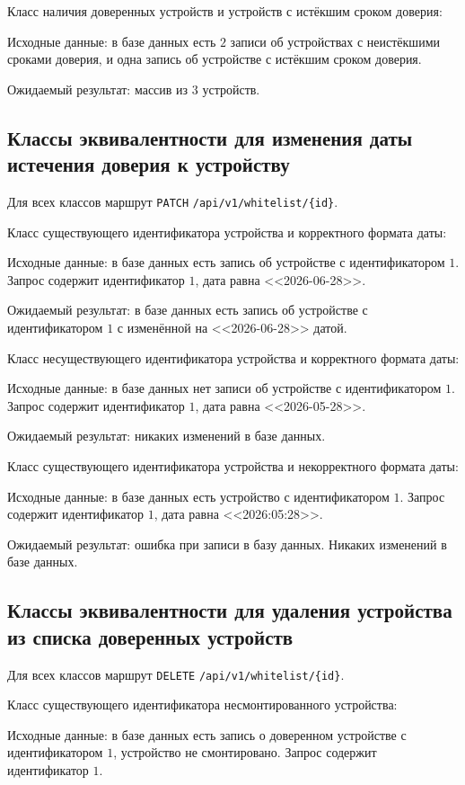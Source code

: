 Класс наличия доверенных устройств и устройств с истёкшим сроком доверия:

Исходные данные: в базе данных есть $2$ записи об устройствах с неистёкшими сроками доверия, и одна запись об устройстве с истёкшим сроком доверия.

Ожидаемый результат: массив из $3$ устройств.

\subsection{Классы эквивалентности для изменения даты истечения доверия к устройству}

Для всех классов маршрут \texttt{PATCH} \texttt{/api/v1/whitelist/\{id\}}.

Класс существующего идентификатора устройства и корректного формата даты:

Исходные данные: в базе данных есть запись об устройстве с идентификатором $1$. Запрос содержит идентификатор $1$, дата равна <<2026-06-28>>.

Ожидаемый результат: в базе данных есть запись об устройстве с идентификатором $1$ с изменённой на <<2026-06-28>> датой.

Класс несуществующего идентификатора устройства и корректного формата даты:

Исходные данные: в базе данных нет записи об устройстве с идентификатором $1$. Запрос содержит идентификатор $1$, дата равна <<2026-05-28>>.

Ожидаемый результат: никаких изменений в базе данных.

Класс существующего идентификатора устройства и некорректного формата даты:

Исходные данные: в базе данных есть устройство с идентификатором $1$. Запрос содержит идентификатор $1$, дата равна <<2026:05:28>>.

Ожидаемый результат: ошибка при записи в базу данных. Никаких изменений в базе данных.

\subsection{Классы эквивалентности для удаления устройства из списка доверенных устройств}

Для всех классов маршрут \texttt{DELETE} \texttt{/api/v1/whitelist/\{id\}}.

Класс существующего идентификатора несмонтированного устройства:

Исходные данные: в базе данных есть запись о доверенном устройстве с идентификатором $1$, устройство не смонтировано. Запрос содержит идентификатор $1$.

